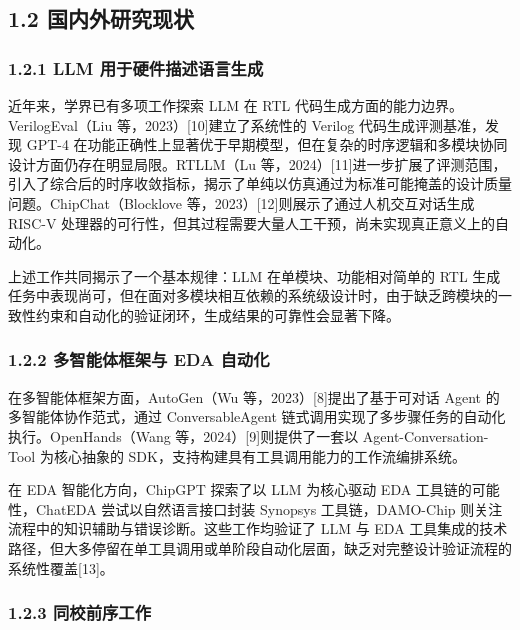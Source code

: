 \subsection{1.2
国内外研究现状}\label{ux56fdux5185ux5916ux7814ux7a76ux73b0ux72b6}

\subsubsection{1.2.1 LLM
用于硬件描述语言生成}\label{llm-ux7528ux4e8eux786cux4ef6ux63cfux8ff0ux8bedux8a00ux751fux6210}

近年来，学界已有多项工作探索 LLM 在 RTL
代码生成方面的能力边界。VerilogEval（Liu
等，2023）{[}10{]}建立了系统性的 Verilog 代码生成评测基准，发现 GPT-4
在功能正确性上显著优于早期模型，但在复杂的时序逻辑和多模块协同设计方面仍存在明显局限。RTLLM（Lu
等，2024）{[}11{]}进一步扩展了评测范围，引入了综合后的时序收敛指标，揭示了单纯以仿真通过为标准可能掩盖的设计质量问题。ChipChat（Blocklove
等，2023）{[}12{]}则展示了通过人机交互对话生成 RISC-V
处理器的可行性，但其过程需要大量人工干预，尚未实现真正意义上的自动化。

上述工作共同揭示了一个基本规律：LLM 在单模块、功能相对简单的 RTL
生成任务中表现尚可，但在面对多模块相互依赖的系统级设计时，由于缺乏跨模块的一致性约束和自动化的验证闭环，生成结果的可靠性会显著下降。

\subsubsection{1.2.2 多智能体框架与 EDA
自动化}\label{ux591aux667aux80fdux4f53ux6846ux67b6ux4e0e-eda-ux81eaux52a8ux5316}

在多智能体框架方面，AutoGen（Wu 等，2023）{[}8{]}提出了基于可对话 Agent
的多智能体协作范式，通过 ConversableAgent
链式调用实现了多步骤任务的自动化执行。OpenHands（Wang
等，2024）{[}9{]}则提供了一套以 Agent-Conversation-Tool 为核心抽象的
SDK，支持构建具有工具调用能力的工作流编排系统。

在 EDA 智能化方向，ChipGPT 探索了以 LLM 为核心驱动 EDA
工具链的可能性，ChatEDA 尝试以自然语言接口封装 Synopsys
工具链，DAMO-Chip 则关注流程中的知识辅助与错误诊断。这些工作均验证了 LLM
与 EDA
工具集成的技术路径，但大多停留在单工具调用或单阶段自动化层面，缺乏对完整设计验证流程的系统性覆盖{[}13{]}。

\subsubsection{1.2.3
同校前序工作}\label{ux540cux6821ux524dux5e8fux5de5ux4f5c}

